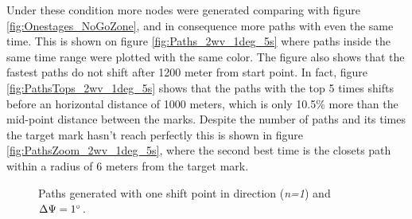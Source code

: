 Under these condition more nodes were generated comparing with figure \ref{fig:Onestages_NoGoZone}, and in consequence more paths with even the same time. This is shown on figure \ref{fig:Paths_2wv_1deg_5s} where paths inside the same time range were plotted with the same color. The figure also shows that the fastest paths do not shift after 1200 meter from start point. In fact, figure \ref{fig:PathsTops_2wv_1deg_5s} shows that the paths with the top 5 times shifts before an horizontal distance of 1000 meters, which is only 10.5\% more than the mid-point distance between the marks. Despite the number of paths and its times the target mark hasn't reach perfectly 
this is shown in figure \ref{fig:PathsZoom_2wv_1deg_5s}, where the second best time is the closets path within a radius of 6 meters from the target mark. %
\begin{figure} [hbt!]
  \centering
  \hfill
  \hfill 
  \caption{Paths generated with one shift point in direction (\textit{n=1}) and $\Delta \Psi =1\degree$.}
\label{fig:Nodes_Paths_2wv_1deg_5s}
\end{figure}


